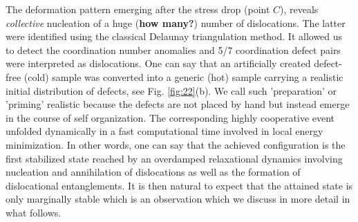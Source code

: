 \documentclass[aps,
superscriptaddress,notitlepage]{revtex4-1}
\begin{document}
  The  deformation pattern  emerging after the stress drop (point $C$),  reveals   \emph{collective}   nucleation  of a huge (\textbf{how many?})  number of dislocations. The latter were identified  using the classical Delaunay triangulation method. It  allowed us  to detect  the coordination number anomalies and 5/7 coordination defect pairs were interpreted    as dislocations. One can say that  an artificially created    defect-free  (cold) sample was converted  into a  generic (hot)  sample carrying  a realistic initial distribution of defects, see Fig. \ref{fig:22}(b).  We call such 'preparation' or 'priming' realistic because  the  defects  are not placed by hand but instead emerge in the course of self organization. The corresponding  highly cooperative  event unfolded dynamically  in a fast computational time involved in local energy minimization.   In other words, one can say that  the achieved configuration is  the first stabilized state   reached by an overdamped relaxational dynamics involving   nucleation and annihilation of dislocations as well as the formation of dislocational entanglements. It is then natural to expect that the attained  state is only marginally stable which is an observation which we discuss in more detail in what follows. 
  
\end{document}
